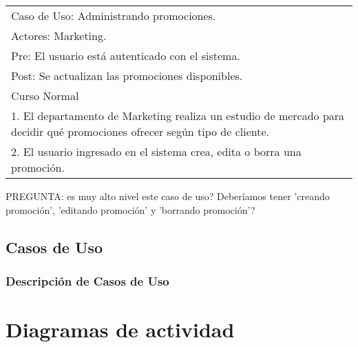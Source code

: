 \vspace{1cm}

\begin{tabular}{ | p{14cm} | }
  \hline
  Caso de Uso: Administrando promociones. \\
  Actores: Marketing. \\
  Pre: El usuario está autenticado con el sistema. \\
  Post: Se actualizan las promociones disponibles. \\
  \hline
  Curso Normal\\
  \hline
  1. El departamento de Marketing realiza un estudio de mercado para decidir qué promociones ofrecer según tipo de cliente. \\
  2. El usuario ingresado en el sistema crea, edita o borra una promoción. \\
  \hline
\end{tabular}

\vspace{0.5cm}
PREGUNTA: es muy alto nivel este caso de uso? Deberíamos tener 'creando promoción', 'editando promoción' y 'borrando promoción'?


\subsection{Casos de Uso}

\subsubsection{Descripción de Casos de Uso}

\clearpage

\section{Diagramas de actividad}

\clearpage
